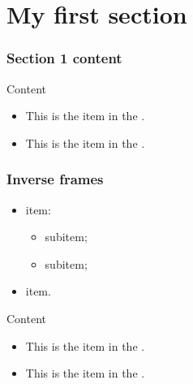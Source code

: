 \documentclass{beamerunicatt}
\begin{document}
\section{My first section}

\begin{frame}
\frametitle{Section 1 content}
\begin{block}{Content}
\begin{itemize}
\item This is the  item in the .
\item This is the  item in the .
\end{itemize}
\end{block}
\end{frame}

\begin{inverseframe}
\frametitle{Inverse frames}

\begin{itemize}
\item {} item:
\begin{itemize}
\normalsize
\item {} subitem;
\item {} subitem;
\end{itemize}
\item {}  item.
\end{itemize}

\begin{block}{Content}
\begin{itemize}
\item This is the  item in the .
\item This is the  item in the .
\end{itemize}
\end{block}
\end{inverseframe}
\end{document}
